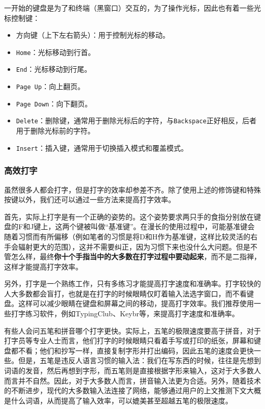 一开始的键盘是为了和终端（黑窗口）交互的，为了操作光标，因此也有着一些光标控制键：
\begin{itemize}
  \item 方向键（上下左右箭头）：用于控制光标的移动。
  \item \texttt{Home}：光标移动到行首。
  \item \texttt{End}：光标移动到行尾。
  \item \texttt{Page Up}：向上翻页。
  \item \texttt{Page Down}：向下翻页。
  \item \texttt{Delete}：删除键，通常用于删除光标后的字符，与\texttt{Backspace}正好相反，后者用于删除光标前的字符。
  \item \texttt{Insert}：插入键，通常用于切换插入模式和覆盖模式。
\end{itemize}

\subsubsection{高效打字}

虽然很多人都会打字，但是打字的效率却参差不齐。除了使用上述的修饰键和特殊按键以外，我们还可以通过一些方法来提高打字效率。

首先，实际上打字是有一个正确的姿势的。这个姿势要求两只手的食指分别放在键盘的F和J键上，这两个键被叫做“基准键”。在漫长的使用过程中，可能基准键会随着习惯而有所偏移（例如笔者的习惯是将D和H作为基准键，这样比较灵活的右手会辐射更大的范围），这并不需要纠正，因为习惯下来也没什么大问题。但是不管怎么样，最终\textbf{你十个手指当中的大多数在打字过程中要动起来}，而不是二指禅，这样才能提高打字效率。

另外，打字是一个熟练工作，只有多练习才能提高打字速度和准确率。打字较快的人大多数都会盲打，也就是在打字的时候眼睛仅盯着输入法选字窗口，而不看键盘。这样可以减少眼睛在键盘和屏幕之间的移动，提高打字效率。我们推荐使用一些打字练习软件，例如TypingClub、Keybr等，来提高打字速度和准确率。

有些人会问五笔和拼音哪个打字更快。实际上，五笔的极限速度要高于拼音，对于打字员等专业人士而言，他们打字的时候眼睛只看着手写或打印的纸张，屏幕和键盘都不看；他们和抄写一样，直接复制字形并打出编码，因此五笔的速度会更快一些。但是，五笔是违反人语言习惯的输入法：我们在写东西的时候，往往是先想到词语的发音，然后再想到字形，而五笔则是直接根据字形来输入，这对于大多数人而言并不自然。因此，对于大多数人而言，拼音输入法更为合适。另外，随着技术的不断进步，现代的大多数输入法连接了网络，能够通过用户的上文推测下文大概是什么词语，从而提高了输入效率，可以媲美甚至超越五笔的极限速度。


